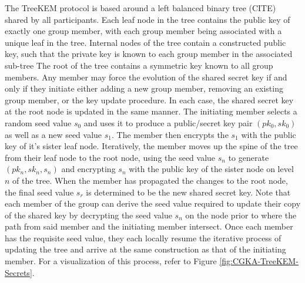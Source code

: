 The TreeKEM protocol is based around a left balanced binary tree (CITE) shared by all participants.
Each leaf node in the tree contains the public key of exactly one group member, with each group member being associated with a unique leaf in the tree.
Internal nodes of the tree contain a constructed public key, such that the private key is known to each group member in the associated sub-tree
The root of the tree contains a symmetric key known to all group members.
Any member may force the evolution of the shared secret key if and only if they initiate either adding a new group member, removing an existing group member, or the key update procedure.
In each case, the shared secret key at the root node is updated in the same manner.
The initiating member selects a random seed value \(s_0\) and uses it to produce a public/secret key pair \((pk_0,sk_0)\) as well as a new seed value \(s_1\).
The member then encrypts the \(s_1\) with the public key of it's sister leaf node.
Iteratively, the member moves up the spine of the tree from their leaf node to the root node, using the seed value \(s_n\) to generate \((pk_n,sk_n,s_n)\) and encrypting \(s_n\) with the public key of the sister node on level \(n\) of the tree.
When the member has propagated the changes to the root node, the final seed value \(s_r\) is determined to be the new shared secret key.
Note that each member of the group can derive the seed value required to update their copy of the shared key by decrypting the seed value \(s_n\) on the node prior to where the path from said member and the initiating member intersect.
Once each member has the requisite seed value, they each locally resume the iterative process of updating the tree and arrive at the same construction as that of the initiating member.
For a visualization of this process, refer to Figure \ref{fig:CGKA-TreeKEM-Secrets}.

